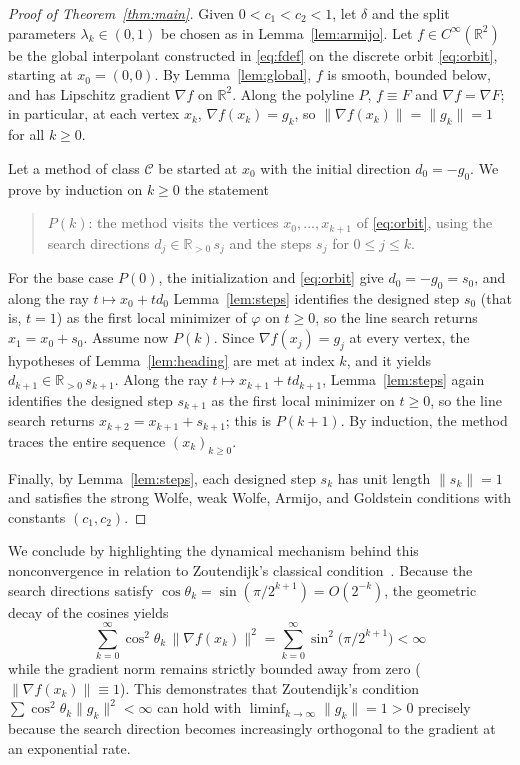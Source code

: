 \documentclass[11pt]{article}
\newcommand{\R}{\mathbb{R}}
\begin{document}
\begin{proof}[Proof of Theorem~\ref{thm:main}]
Given $0<c_1<c_2<1$, let $\delta$ and the split parameters $\lambda_k \in (0, 1)$ be chosen as in Lemma~\ref{lem:armijo}.
Let $f \in C^\infty(\R^2)$ be the global interpolant constructed in \eqref{eq:fdef} on the discrete orbit \eqref{eq:orbit}, starting at $x_0 = (0, 0)$.
By Lemma~\ref{lem:global}, $f$ is smooth, bounded below, and has Lipschitz gradient $\nabla f$ on $\R^2$.
Along the polyline $P$, $f \equiv F$ and $\nabla f = \nabla F$; in particular, at each vertex $x_k$, $\nabla f(x_k) = g_k$, so $\|\nabla f(x_k)\| = \|g_k\| = 1$ for all $k \ge 0$.

Let a method of class $\mathcal C$ be started at $x_0$ with the initial direction $d_0 = -g_0$. We prove by induction on $k \ge 0$ the statement
\begin{quote}
$P(k)$: the method visits the vertices $x_0, \dots, x_{k+1}$ of \eqref{eq:orbit}, using the search directions $d_j \in \R_{>0}\,s_j$ and the steps $s_j$ for $0 \le j \le k$.
\end{quote}
For the base case $P(0)$, the initialization and \eqref{eq:orbit} give $d_0 = -g_0 = s_0$, and along the ray $t \mapsto x_0 + td_0$ Lemma~\ref{lem:steps} identifies the designed step $s_0$ (that is, $t = 1$) as the first local minimizer of $\varphi$ on $t \ge 0$, so the line search returns $x_1 = x_0 + s_0$.
Assume now $P(k)$. Since $\nabla f(x_j) = g_j$ at every vertex, the hypotheses of Lemma~\ref{lem:heading} are met at index $k$, and it yields $d_{k+1} \in \R_{>0}\,s_{k+1}$.
Along the ray $t \mapsto x_{k+1} + td_{k+1}$, Lemma~\ref{lem:steps} again identifies the designed step $s_{k+1}$ as the first local minimizer on $t \ge 0$, so the line search returns $x_{k+2} = x_{k+1} + s_{k+1}$; this is $P(k+1)$.
By induction, the method traces the entire sequence $(x_k)_{k \ge 0}$.

Finally, by Lemma~\ref{lem:steps}, each designed step $s_k$ has unit length $\|s_k\| = 1$ and satisfies the strong Wolfe, weak Wolfe, Armijo, and Goldstein conditions with constants $(c_1, c_2)$.
\end{proof}

We conclude by highlighting the dynamical mechanism behind this nonconvergence in relation to Zoutendijk's classical condition~\cite{zoutendijk1970}.
Because the search directions satisfy $\cos\theta_k = \sin(\pi/2^{k+1}) = O(2^{-k})$, the geometric decay of the cosines yields
\[
\sum_{k=0}^\infty \cos^2\theta_k\,\|\nabla f(x_k)\|^2 = \sum_{k=0}^\infty \sin^2\bigl(\pi/2^{k+1}\bigr) < \infty
\]
while the gradient norm remains strictly bounded away from zero ($\|\nabla f(x_k)\| \equiv 1$).
This demonstrates that Zoutendijk's condition $\sum \cos^2\theta_k \|g_k\|^2 < \infty$ can hold with $\liminf_{k\to\infty} \|g_k\| = 1 > 0$ precisely because the search direction becomes increasingly orthogonal to the gradient at an exponential rate.
\end{document}

